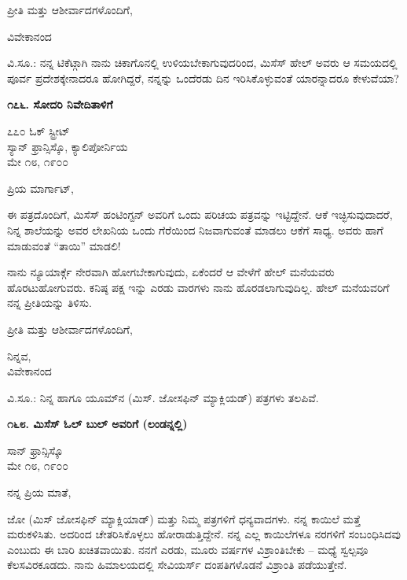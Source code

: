 ಪ್ರೀತಿ ಮತ್ತು ಆಶೀರ್ವಾದಗಳೊಂದಿಗೆ,

\begin{flushright}
ವಿವೇಕಾನಂದ
\end{flushright}

ವಿ.ಸೂ.: ನನ್ನ ಟಿಕೆಟ್ಗಾಗಿ ನಾನು ಚಿಕಾಗೊನಲ್ಲಿ ಉಳಿಯಬೇಕಾಗುವುದರಿಂದ, ಮಿಸೆಸ್ ಹೇಲ್ ಅವರು ಆ ಸಮಯದಲ್ಲಿ ಪೂರ್ವ ಪ್ರದೇಶಕ್ಕೇನಾದರೂ ಹೋಗಿದ್ದರೆ, ನನ್ನನ್ನು ಒಂದೆರಡು ದಿನ ಇರಿಸಿಕೊಳ್ಳುವಂತೆ ಯಾರನ್ನಾದರೂ ಕೇಳುವೆಯಾ?

\begin{center}
\textbf{೧೭೬. ಸೋದರಿ ನಿವೇದಿತಾಳಿಗೆ}
\end{center}

\begin{flushright}
೭೭೦ ಓಕ್ ಸ್ಟ್ರೀಟ್\\ಸ್ಯಾನ್ ಫ್ರಾನ್ಸಿಸ್ಕೊ, ಕ್ಯಾಲಿಪೋರ್ನಿಯ\\ಮೇ ೧೮, ೧೯೦೦
\end{flushright}

ಪ್ರಿಯ ಮಾರ್ಗಾಟ್,

ಈ ಪತ್ರದೊಂದಿಗೆ, ಮಿಸೆಸ್ ಹಂಟಿಂಗ್ಟನ್ ಅವರಿಗೆ ಒಂದು ಪರಿಚಯ ಪತ್ರವನ್ನು ಇಟ್ಟಿದ್ದೇನೆ. ಆಕೆ ಇಚ್ಛಿಸುವುದಾದರೆ, ನಿನ್ನ ಶಾಲೆಯನ್ನು ಅವರ ಲೇಖನಿಯ ಒಂದು ಗೆರೆಯಿಂದ ನಿಜವಾಗುವಂತೆ ಮಾಡಲು ಆಕೆಗೆ ಸಾಧ್ಯ. ಅವರು ಹಾಗೆ ಮಾಡುವಂತೆ “ತಾಯಿ” ಮಾಡಲಿ!

ನಾನು ನ್ಯೂಯಾರ್ಕ್ಗೆ ನೇರವಾಗಿ ಹೋಗಬೇಕಾಗುವುದು, ಏಕೆಂದರೆ ಆ ವೇಳೆಗೆ ಹೇಲ್ ಮನೆಯವರು ಹೊರಟುಹೋಗುವರು. ಕನಿಷ್ಠ ಪಕ್ಷ ಇನ್ನು ಎರಡು ವಾರಗಳು ನಾನು ಹೊರಡಲಾಗುವುದಿಲ್ಲ. ಹೇಲ್ ಮನೆಯವರಿಗೆ ನನ್ನ ಪ್ರೀತಿಯನ್ನು ತಿಳಿಸು.

ಪ್ರೀತಿ ಮತ್ತು ಆಶೀರ್ವಾದಗಳೊಂದಿಗೆ,

\begin{flushright}
ನಿನ್ನವ,\\ವಿವೇಕಾನಂದ
\end{flushright}

ವಿ.ಸೂ.: ನಿನ್ನ ಹಾಗೂ ಯೂಮ್​ನ (ಮಿಸ್. ಜೋಸಫಿನ್ ಮ್ಯಾಕ್ಲಿಯಡ್) ಪತ್ರಗಳು ತಲಪಿವೆ.

\begin{center}
\textbf{೧೬೮. ಮಿಸೆಸ್ ಓಲ್ ಬುಲ್ ಅವರಿಗೆ (ಲಂಡನ್ನಲ್ಲಿ)}
\end{center}

\begin{flushright}
ಸಾನ್ ಫ್ರಾನ್ಸಿಸ್ಕೊ\\ಮೇ ೧೮, ೧೯೦೦
\end{flushright}

ನನ್ನ ಪ್ರಿಯ ಮಾತೆ,

ಜೋ (ಮಿಸ್ ಜೋಸಫಿನ್ ಮ್ಯಾಕ್ಲಿಯಾಡ್) ಮತ್ತು ನಿಮ್ಮ ಪತ್ರಗಳಿಗೆ ಧನ್ಯವಾದಗಳು. ನನ್ನ ಕಾಯಿಲೆ ಮತ್ತೆ ಮರುಕಳಿಸಿತು. ಅದರಿಂದ ಚೇತರಿಸಿಕೊಳ್ಳಲು ಹೋರಾಡುತ್ತಿದ್ದೇನೆ. ನನ್ನ ಎಲ್ಲ ಕಾಯಿಲೆಗಳೂ ನರಗಳಿಗೆ ಸಂಬಂಧಿಸಿದವು ಎಂಬುದು ಈ ಬಾರಿ ಖಚಿತವಾಯಿತು. ನನಗೆ ಎರಡು, ಮೂರು ವರ್ಷಗಳ ವಿಶ್ರಾಂತಿಬೇಕು – ಮಧ್ಯೆ ಸ್ವಲ್ಪವೂ ಕೆಲಸವಿರಕೂಡದು. ನಾನು ಹಿಮಾಲಯದಲ್ಲಿ ಸೇವಿಯರ್ಸ್ ದಂಪತಿಗಳೊಡನೆ ವಿಶ್ರಾಂತಿ ಪಡೆಯುತ್ತೇನೆ.

